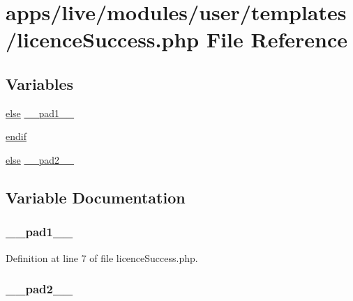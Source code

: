 \hypertarget{licence_success_8php}{\section{apps/live/modules/user/templates/licence\-Success.php File Reference}
\label{licence_success_8php}
}
\subsection*{Variables}
\begin{DoxyCompactItemize}
\item 
\hyperlink{live_2modules_2team_2templates_2management_success_8php_a0544c3fe466e421738dae463968b70ba}{else} \hyperlink{licence_success_8php_ae8b4bb1441c6ab4dcb28a37bc46c8ead}{\-\_\-\-\_\-pad1\-\_\-\-\_\-}
\item 
\hyperlink{licence_success_8php_a82cd33ca97ff99f2fcc5e9c81d65251b}{endif}
\item 
\hyperlink{live_2modules_2team_2templates_2management_success_8php_a0544c3fe466e421738dae463968b70ba}{else} \hyperlink{licence_success_8php_aed2d37b4e8da3f52103ae96ce9d26d82}{\-\_\-\-\_\-pad2\-\_\-\-\_\-}
\end{DoxyCompactItemize}


\subsection{Variable Documentation}
\hypertarget{licence_success_8php_ae8b4bb1441c6ab4dcb28a37bc46c8ead}{
\subsubsection[{\-\_\-\-\_\-pad1\-\_\-\-\_\-}]{ \-\_\-\-\_\-pad1\-\_\-\-\_\-}}\label{licence_success_8php_ae8b4bb1441c6ab4dcb28a37bc46c8ead}


Definition at line 7 of file licence\-Success.\-php.

\hypertarget{licence_success_8php_aed2d37b4e8da3f52103ae96ce9d26d82}{
\subsubsection[{\-\_\-\-\_\-pad2\-\_\-\-\_\-}]{ \-\_\-\-\_\-pad2\-\_\-\-\_\-}}\label{licence_success_8php_aed2d37b4e8da3f52103ae96ce9d26d82}


